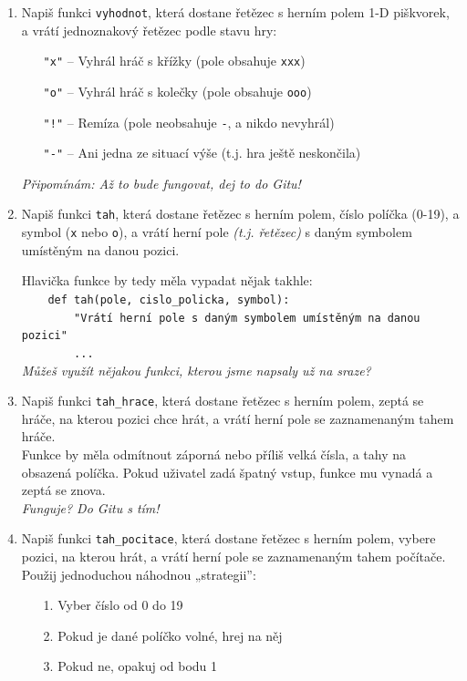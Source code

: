 \documentclass[a4paper,10pt]{article}
\begin{document}
\begin{enumerate}[resume]

\item Napiš funkci \texttt{vyhodnot}, která dostane řetězec
    s herním polem 1-D piškvorek,
    a vrátí jednoznakový řetězec podle stavu hry:
    \begin{enumerate}
    \item[\texttt{"x"}] – Vyhrál hráč s křížky (pole obsahuje \texttt{xxx})
    \item[\texttt{"o"}] – Vyhrál hráč s kolečky (pole obsahuje \texttt{ooo})
    \item[\texttt{"!"}] – Remíza (pole neobsahuje \texttt{-}, a nikdo nevyhrál)
    \item[\texttt{"-"}] – Ani jedna ze situací výše (t.j. hra ještě neskončila)
    \end{enumerate}
    \emph{\small Připomínám: Až to bude fungovat, dej to do Gitu!}

\item Napiš funkci \texttt{tah}, která dostane řetězec s herním polem,
    číslo políčka (0-19), a symbol (\texttt{x} nebo \texttt{o}),
    a vrátí herní pole \emph{(t.j. řetězec)} s daným symbolem umístěným na danou pozici.

    Hlavička funkce by tedy měla vypadat nějak takhle:
\\\verb+    def tah(pole, cislo_policka, symbol):+
\\\verb+        "Vrátí herní pole s daným symbolem umístěným na danou pozici"+
\\\verb+        ...+
    \\\emph{Můžeš využít nějakou funkci, kterou jsme napsaly už na sraze?}

\item Napiš funkci \texttt{tah\_hrace}, která dostane řetězec s herním polem,
    zeptá se hráče, na kterou pozici chce hrát, a vrátí herní pole
    se zaznamenaným tahem hráče.
    \\Funkce by měla odmítnout záporná nebo příliš velká čísla,
    a tahy na obsazená políčka.
    Pokud uživatel zadá špatný vstup, funkce mu vynadá a zeptá se znova.
    \\\emph{\small Funguje? Do Gitu s tím!}

\item Napiš funkci \texttt{tah\_pocitace}, která dostane řetězec s herním polem,
    vybere pozici, na kterou hrát, a vrátí herní pole
    se zaznamenaným tahem počítače.
    \\Použij jednoduchou náhodnou „strategii”:
    \begin{enumerate}
    \item[1.] Vyber číslo od 0 do 19
    \item[2.] Pokud je dané políčko volné, hrej na něj
    \item[3.] Pokud ne, opakuj od bodu 1
    \end{enumerate}


\end{enumerate}
\end{document}
